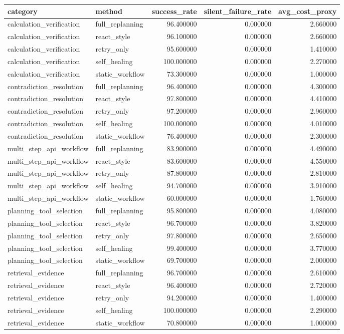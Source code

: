 \begin{tabular}{llrrr}
\toprule
category & method & success_rate & silent_failure_rate & avg_cost_proxy \\
\midrule
calculation_verification & full_replanning & 96.400000 & 0.000000 & 2.660000 \\
calculation_verification & react_style & 96.100000 & 0.000000 & 2.660000 \\
calculation_verification & retry_only & 95.600000 & 0.000000 & 1.410000 \\
calculation_verification & self_healing & 100.000000 & 0.000000 & 2.270000 \\
calculation_verification & static_workflow & 73.300000 & 0.000000 & 1.000000 \\
contradiction_resolution & full_replanning & 96.400000 & 0.000000 & 4.300000 \\
contradiction_resolution & react_style & 97.800000 & 0.000000 & 4.410000 \\
contradiction_resolution & retry_only & 97.200000 & 0.000000 & 2.960000 \\
contradiction_resolution & self_healing & 100.000000 & 0.000000 & 4.010000 \\
contradiction_resolution & static_workflow & 76.400000 & 0.000000 & 2.300000 \\
multi_step_api_workflow & full_replanning & 83.900000 & 0.000000 & 4.490000 \\
multi_step_api_workflow & react_style & 83.600000 & 0.000000 & 4.550000 \\
multi_step_api_workflow & retry_only & 87.800000 & 0.000000 & 2.810000 \\
multi_step_api_workflow & self_healing & 94.700000 & 0.000000 & 3.910000 \\
multi_step_api_workflow & static_workflow & 60.000000 & 0.000000 & 1.760000 \\
planning_tool_selection & full_replanning & 95.800000 & 0.000000 & 4.080000 \\
planning_tool_selection & react_style & 96.700000 & 0.000000 & 3.820000 \\
planning_tool_selection & retry_only & 97.800000 & 0.000000 & 2.650000 \\
planning_tool_selection & self_healing & 99.400000 & 0.000000 & 3.770000 \\
planning_tool_selection & static_workflow & 69.700000 & 0.000000 & 2.000000 \\
retrieval_evidence & full_replanning & 96.700000 & 0.000000 & 2.610000 \\
retrieval_evidence & react_style & 96.400000 & 0.000000 & 2.720000 \\
retrieval_evidence & retry_only & 94.200000 & 0.000000 & 1.400000 \\
retrieval_evidence & self_healing & 100.000000 & 0.000000 & 2.290000 \\
retrieval_evidence & static_workflow & 70.800000 & 0.000000 & 1.000000 \\
\bottomrule
\end{tabular}
